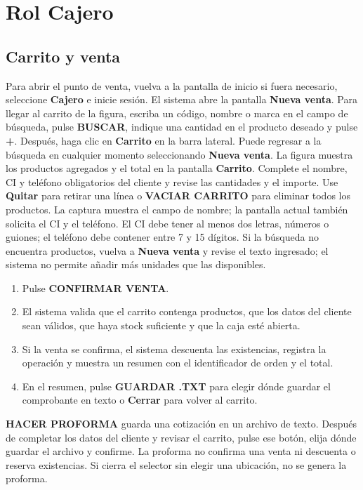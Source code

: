 \documentclass[12pt,a4paper]{article}
\begin{document}
\section{Rol Cajero}
\subsection{Carrito y venta}
Para abrir el punto de venta, vuelva a la pantalla de inicio si fuera necesario, seleccione \textbf{Cajero} e inicie sesión. El sistema abre la pantalla \textbf{Nueva venta}. Para llegar al carrito de la figura, escriba un código, nombre o marca en el campo de búsqueda, pulse \textbf{BUSCAR}, indique una cantidad en el producto deseado y pulse \textbf{+}. Después, haga clic en \textbf{Carrito} en la barra lateral. Puede regresar a la búsqueda en cualquier momento seleccionando \textbf{Nueva venta}.
La figura muestra los productos agregados y el total en la pantalla \textbf{Carrito}. Complete el nombre, CI y teléfono obligatorios del cliente y revise las cantidades y el importe. Use \textbf{Quitar} para retirar una línea o \textbf{VACIAR CARRITO} para eliminar todos los productos. La captura muestra el campo de nombre; la pantalla actual también solicita el CI y el teléfono. El CI debe tener al menos dos letras, números o guiones; el teléfono debe contener entre 7 y 15 dígitos. Si la búsqueda no encuentra productos, vuelva a \textbf{Nueva venta} y revise el texto ingresado; el sistema no permite añadir más unidades que las disponibles.
\begin{enumerate}
\item Pulse \textbf{CONFIRMAR VENTA}.
\item El sistema valida que el carrito contenga productos, que los datos del cliente sean válidos, que haya stock suficiente y que la caja esté abierta.
\item Si la venta se confirma, el sistema descuenta las existencias, registra la operación y muestra un resumen con el identificador de orden y el total.
\item En el resumen, pulse \textbf{GUARDAR .TXT} para elegir dónde guardar el comprobante en texto o \textbf{Cerrar} para volver al carrito.
\end{enumerate}
\textbf{HACER PROFORMA} guarda una cotización en un archivo de texto. Después de completar los datos del cliente y revisar el carrito, pulse ese botón, elija dónde guardar el archivo y confirme. La proforma no confirma una venta ni descuenta o reserva existencias. Si cierra el selector sin elegir una ubicación, no se genera la proforma.
\end{document}
